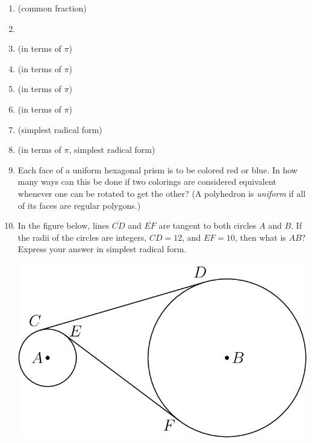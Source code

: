 \documentclass{article}
\begin{document}
\begin{enumerate}
\item \underline{\hspace{3in}} (common fraction)\vspace{1cm}
\item \underline{\hspace{3in}}\vspace{1cm}
\item \underline{\hspace{3in}} (in terms of $\pi$)\vspace{1cm}
\item \underline{\hspace{3in}} (in terms of $\pi$)\vspace{1cm}
\item \underline{\hspace{3in}} (in terms of $\pi$)\vspace{1cm}
\item \underline{\hspace{3in}} (in terms of $\pi$)\vspace{1cm}
\item \underline{\hspace{3in}} (simplest radical form)\vspace{1cm}
\item \underline{\hspace{3in}} (in terms of $\pi$, simplest radical form)\vspace{1cm}
\item Each face of a uniform hexagonal prism is to be colored red or blue. In how many ways can this be done if two colorings are considered equivalent whenever one can be rotated to get the other? (A polyhedron is \emph{uniform} if all of its faces are regular polygons.)
\vspace{1cm}
\item In the figure below, lines $\overline{CD}$ and $\overline{EF}$ are tangent to both circles $A$ and $B$. If the radii of the circles are integers, $CD = 12$, and $EF = 10$, then what is $AB$? Express your answer in simplest radical form.
\begin{center}
\includegraphics[scale=0.2]{circles.png}
\end{center}
\end{enumerate}
\end{document}
